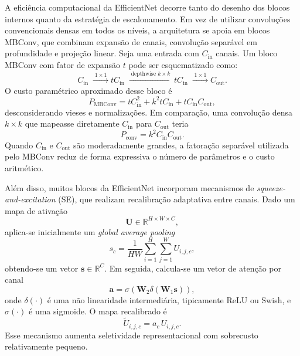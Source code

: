 \documentclass[tcc,capa]{texufpel}
\begin{document}
A eficiência computacional da EfficientNet decorre tanto do desenho dos blocos internos quanto da estratégia de escalonamento. Em vez de utilizar convoluções convencionais densas em todos os níveis, a arquitetura se apoia em blocos MBConv, que combinam expansão de canais, convolução separável em profundidade e projeção linear. Seja uma entrada com \(C_{\text{in}}\) canais. Um bloco MBConv com fator de expansão \(t\) pode ser esquematizado como:
\begin{equation}
	C_{\text{in}}
	\;\xrightarrow{\;1\times1\;}
	tC_{\text{in}}
	\;\xrightarrow{\;\text{depthwise }k\times k\;}
	tC_{\text{in}}
	\;\xrightarrow{\;1\times1\;}
	C_{\text{out}}.
\end{equation}
O custo paramétrico aproximado desse bloco é
\begin{equation}
	P_{\text{MBConv}}
	=
	tC_{\text{in}}^2
	+
	k^2 tC_{\text{in}}
	+
	tC_{\text{in}}C_{\text{out}},
\end{equation}
desconsiderando vieses e normalizações. Em comparação, uma convolução densa \(k\times k\) que mapeasse diretamente \(C_{\text{in}}\) para \(C_{\text{out}}\) teria
\begin{equation}
	P_{\text{conv}}
	=
	k^2 C_{\text{in}} C_{\text{out}}.
\end{equation}
Quando \(C_{\text{in}}\) e \(C_{\text{out}}\) são moderadamente grandes, a fatoração separável utilizada pelo MBConv reduz de forma expressiva o número de parâmetros e o custo aritmético.

Além disso, muitos blocos da EfficientNet incorporam mecanismos de \textit{squeeze-and-excitation} (SE), que realizam recalibração adaptativa entre canais. Dado um mapa de ativação
\begin{equation}
	\mathbf{U} \in \mathbb{R}^{H \times W \times C},
\end{equation}
aplica-se inicialmente um \textit{global average pooling}
\begin{equation}
	s_c = \frac{1}{HW}\sum_{i=1}^{H}\sum_{j=1}^{W} U_{i,j,c},
\end{equation}
obtendo-se um vetor \(\mathbf{s}\in\mathbb{R}^{C}\). Em seguida, calcula-se um vetor de atenção por canal
\begin{equation}
	\mathbf{a}
	=
	\sigma\!\left(
	\mathbf{W}_2 \delta(\mathbf{W}_1 \mathbf{s})
	\right),
\end{equation}
onde \(\delta(\cdot)\) é uma não linearidade intermediária, tipicamente ReLU ou Swish, e \(\sigma(\cdot)\) é uma sigmoide. O mapa recalibrado é
\begin{equation}
	\tilde{U}_{i,j,c} = a_c \, U_{i,j,c}.
\end{equation}
Esse mecanismo aumenta seletividade representacional com sobrecusto relativamente pequeno.
\end{document}
